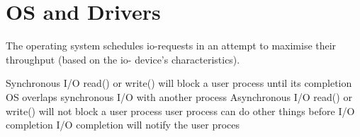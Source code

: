\section{OS and Drivers}





The operating system schedules io-requests in an attempt to maximise their throughput (based on the io- device’s characteristics).






Synchronous I/O read() or write() will block a user process until its completion 
OS overlaps synchronous I/O with another process 
Asynchronous I/O read() or write() will not block a user process 
user process can do other things before I/O completion 
I/O completion will notify the user proces
